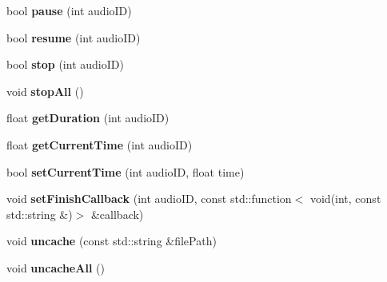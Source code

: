\begin{DoxyCompactItemize}
bool {\bfseries pause} (int audio\+ID)
\item 
\mbox{\label{classexperimental_1_1AudioEngineImpl_a300f339e4c5178c84522fe8654898e43}} 
bool {\bfseries resume} (int audio\+ID)
\item 
\mbox{\label{classexperimental_1_1AudioEngineImpl_a811786e91bb552443b011659e35483bb}} 
bool {\bfseries stop} (int audio\+ID)
\item 
\mbox{\label{classexperimental_1_1AudioEngineImpl_abcf87e42d6015ae5a0760ce815fb6f28}} 
void {\bfseries stop\+All} ()
\item 
\mbox{\label{classexperimental_1_1AudioEngineImpl_a12fa2f700f4d6e4effc72e1ad7e030cb}} 
float {\bfseries get\+Duration} (int audio\+ID)
\item 
\mbox{\label{classexperimental_1_1AudioEngineImpl_a47be5365efeebd307e3891f3f71386f0}} 
float {\bfseries get\+Current\+Time} (int audio\+ID)
\item 
\mbox{\label{classexperimental_1_1AudioEngineImpl_a8abd3b8330fb7ca7f513016055333f9c}} 
bool {\bfseries set\+Current\+Time} (int audio\+ID, float time)
\item 
\mbox{\label{classexperimental_1_1AudioEngineImpl_ab4bc0ee1754fda9638d7d0c4470cf170}} 
void {\bfseries set\+Finish\+Callback} (int audio\+ID, const std\+::function$<$ void(int, const std\+::string \&)$>$ \&callback)
\item 
\mbox{\label{classexperimental_1_1AudioEngineImpl_a4ad8d3d499bf3e5fd262d710b215891e}} 
void {\bfseries uncache} (const std\+::string \&file\+Path)
\item 
\mbox{\label{classexperimental_1_1AudioEngineImpl_ae439dacc5acebf311686ebf6f1f6b3df}} 
void {\bfseries uncache\+All} ()
\item 
\mbox{\label{classexperimental_1_1AudioEngineImpl_a2e1975784a08e524ebc2b1bf845c3b75}} 

\end{DoxyCompactItemize}
